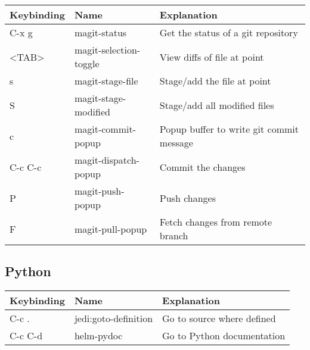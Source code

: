 \documentclass[11pt]{article}
\begin{document}
\begin{center}
\begin{tabular}{lll}
Keybinding & Name & Explanation\\
\hline
C-x g & magit-status & Get the status of a git repository\\
<TAB> & magit-selection-toggle & View diffs of file at point\\
s & magit-stage-file & Stage/add the file at point\\
S & magit-stage-modified & Stage/add all modified files\\
c & magit-commit-popup & Popup buffer to write git commit message\\
C-c C-c & magit-dispatch-popup & Commit the changes\\
P & magit-push-popup & Push changes\\
F & magit-pull-popup & Fetch changes from remote branch\\
\end{tabular}
\end{center}

\subsection{Python}
\label{sec:orgheadline6}

\begin{center}
\begin{tabular}{lll}
Keybinding & Name & Explanation\\
\hline
C-c . & jedi:goto-definition & Go to source where defined\\
C-c C-d & helm-pydoc & Go to Python documentation\\
\end{tabular}
\end{center}
\end{document}
